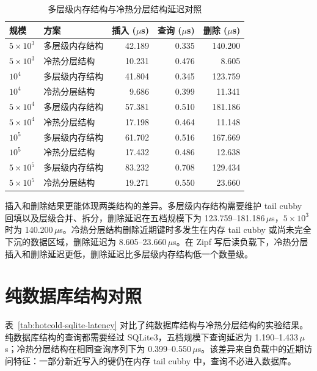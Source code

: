 \begin{table}[htbp]
  \centering
  \caption{多层级内存结构与冷热分层结构延迟对照}
  \label{tab:hotcold-memory-latency}
  \small
  \begin{tabular}{llrrr}
    \toprule
    规模 & 方案 & 插入 ($\mu$s) & 查询 ($\mu$s) & 删除 ($\mu$s) \\
    \midrule
    \(5\times10^3\)   & 多层级内存结构 & 42.189 & 0.335 & 140.200 \\
    \(5\times10^3\)   & 冷热分层结构   & 10.231 & 0.476 & 8.605 \\
    \(10^4\)          & 多层级内存结构 & 41.804 & 0.345 & 123.759 \\
    \(10^4\)          & 冷热分层结构   & 9.686  & 0.399 & 11.341 \\
    \(5\times10^4\)   & 多层级内存结构 & 57.381 & 0.510 & 181.186 \\
    \(5\times10^4\)   & 冷热分层结构   & 17.198 & 0.464 & 11.148 \\
    \(10^5\)          & 多层级内存结构 & 61.702 & 0.516 & 167.669 \\
    \(10^5\)          & 冷热分层结构   & 17.432 & 0.486 & 12.638 \\
    \(5\times10^5\)   & 多层级内存结构 & 83.232 & 0.708 & 129.434 \\
    \(5\times10^5\)   & 冷热分层结构   & 19.271 & 0.550 & 23.660 \\
    \bottomrule
  \end{tabular}
\end{table}

插入和删除结果更能体现两类结构的差异。多层级内存结构需要维护 tail cubby 回填以及层级合并、拆分，删除延迟在五档规模下为 123.759--181.186\,$\mu$s，\(5\times10^3\) 时为 140.200\,$\mu$s。冷热分层结构删除近期键时多发生在内存 tail cubby 或尚未完全下沉的数据区域，删除延迟为 8.605--23.660\,$\mu$s。在 Zipf 写后读负载下，冷热分层插入和删除延迟更低，删除延迟比多层级内存结构低一个数量级。

\section{纯数据库结构对照}

表~\ref{tab:hotcold-sqlite-latency} 对比了纯数据库结构与冷热分层结构的实验结果。纯数据库结构的查询都需要经过 SQLite3\cite{gaffney2022sqlite}，五档规模下查询延迟为 1.190--1.433\,$\mu$s；冷热分层结构在相同查询序列下为 0.399--0.550\,$\mu$s。该差异来自负载中的近期访问特征：一部分新近写入的键仍在内存 tail cubby 中，查询不必进入数据库。

